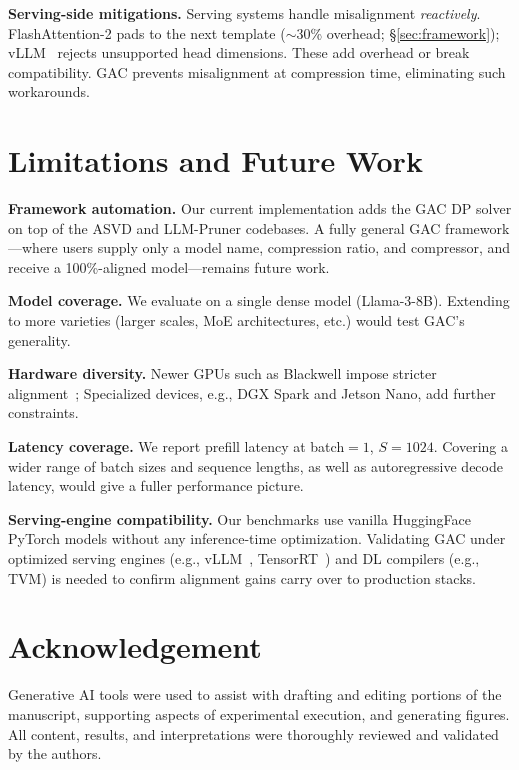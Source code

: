 \documentclass[sigplan,10pt]{acmart}
\begin{document}
\noindent \textbf{Serving-side mitigations.}
Serving systems handle misalignment \emph{reactively}.
FlashAttention-2 pads to the next template
(${\sim}$30\% overhead; \S\ref{sec:framework}); vLLM~\citep{vllm} rejects unsupported head dimensions.
These add overhead or break compatibility.
GAC prevents misalignment at compression time, eliminating such workarounds.

\section{Limitations and Future Work}
\label{sec:future}

\noindent \textbf{Framework automation.}
Our current implementation adds the GAC DP solver on top of the ASVD and LLM-Pruner codebases.
A fully general GAC framework---where users supply only a model name, compression ratio, and compressor, and receive a 100\%-aligned model---remains future work.

\noindent \textbf{Model coverage.}
We evaluate on a single dense model (Llama-3-8B).
Extending to more varieties (larger scales, MoE architectures, etc.) would test GAC's generality.

\noindent \textbf{Hardware diversity.}
Newer GPUs such as Blackwell impose stricter alignment~\citep{nvidia_tensor_core_evolution2024,nvidia_hopper_whitepaper,flashattention3};
Specialized devices, e.g., DGX Spark and Jetson Nano, add further constraints.

\noindent \textbf{Latency coverage.}
We report prefill latency at batch${=}1$, $S{=}1024$.
Covering a wider range of batch sizes and sequence lengths, as well as autoregressive decode latency, would give a fuller performance picture.

\noindent \textbf{Serving-engine compatibility.}
Our benchmarks use vanilla HuggingFace PyTorch models without any inference-time optimization.
Validating GAC under optimized serving engines (e.g., vLLM~\citep{vllm}, TensorRT~\citep{tensorrt}) and DL compilers (e.g., TVM) is needed to confirm alignment gains carry over to production stacks.


\clearpage
\section*{Acknowledgement}
Generative AI tools were used to assist with drafting and editing portions of the manuscript, supporting aspects of experimental execution, and generating figures. All content, results, and interpretations were thoroughly reviewed and validated by the authors.
\end{document}
